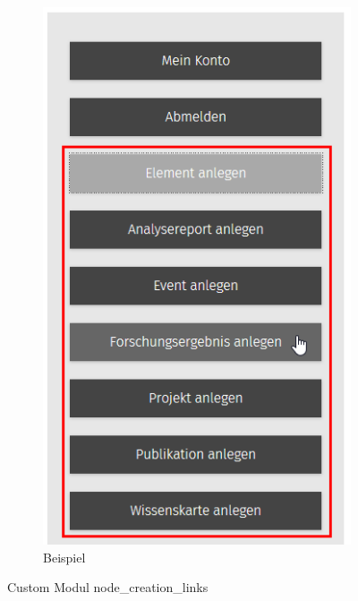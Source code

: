 \begin{figure}[H]
	\begin{subfigure}[b]{0.4\textwidth}
		\centering
		\includegraphics[height=0.20\textheight]{images/example_nodecreationlinks}
		\caption[]{Beispiel}
		\label{fig:example_nodecreationlinks}
	\end{subfigure}
	\caption{Custom Modul node\_creation\_links}
	\label{fig:nodecreationlinks}
\end{figure}

